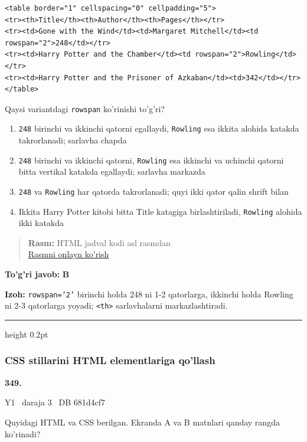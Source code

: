 \documentclass[10pt,a4paper,oneside]{article}
\begin{document}
\par
\begin{lstlisting}
<table border="1" cellspacing="0" cellpadding="5">
<tr><th>Title</th><th>Author</th><th>Pages</th></tr>
<tr><td>Gone with the Wind</td><td>Margaret Mitchell</td><td rowspan="2">248</td></tr>
<tr><td>Harry Potter and the Chamber</td><td rowspan="2">Rowling</td></tr>
<tr><td>Harry Potter and the Prisoner of Azkaban</td><td>342</td></tr>
</table>
\end{lstlisting}


\par
Qaysi variantdagi \texttt{rowspan} ko'rinishi to'g'ri?
\begin{enumerate}[label=\Alph*),leftmargin=9mm]
\item \texttt{248} birinchi va ikkinchi qatorni egallaydi, \texttt{Rowling} esa ikkita alohida katakda takrorlanadi; sarlavha chapda
\item \texttt{248} birinchi va ikkinchi qatorni, \texttt{Rowling} esa ikkinchi va uchinchi qatorni bitta vertikal katakda egallaydi; sarlavha markazda
\item \texttt{248} va \texttt{Rowling} har qatorda takrorlanadi; quyi ikki qator qalin shrift bilan
\item Ikkita Harry Potter kitobi bitta Title katagiga birlashtiriladi, \texttt{Rowling} alohida ikki katakda
\end{enumerate}
\begin{quote}\footnotesize\color{muted}\textbf{Rasm:} HTML jadval kodi asl rasmdan\\
\href{https://github.com/sarvar9417/attestatsiya/blob/main/public/kuzgi-demo/demo_q27_html.svg}{Rasmni onlayn ko'rish}
\end{quote}
\begin{tcolorbox}[enhanced,breakable,colback=teal!4,colframe=teal!45!black,boxrule=0.45pt,arc=1.2mm,left=2.8mm,right=2.8mm,top=2mm,bottom=2mm,before skip=2mm,after skip=2mm]
\textbf{\color{teal}To'g'ri javob:} \textbf{B}
\par\smallskip
\textbf{Izoh:} \texttt{rowspan='2'} birinchi holda 248 ni 1-2 qatorlarga, ikkinchi holda Rowling ni 2-3 qatorlarga yoyadi; \texttt{\textless{}th\textgreater{}} sarlavhalarni markazlashtiradi.
\end{tcolorbox}
\vspace{2mm}\hrule height 0.2pt \vspace{4mm}
\subsubsection{CSS stillarini HTML elementlariga qo'llash}
\hypertarget{q349}{\textbf{\color{ink}349.}}  {\color{muted}\scriptsize Y1 \textbullet\ daraja 3 \textbullet\ DB 681d4cf7}
\par
Quyidagi HTML va CSS berilgan. Ekranda A va B matnlari qanday rangda ko'rinadi?
\end{document}
